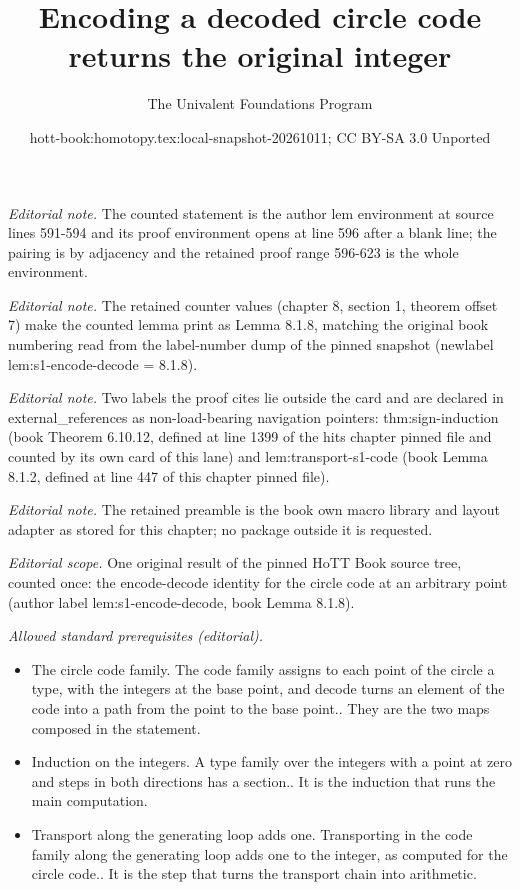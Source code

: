 \documentclass[10pt,a4paper]{article}
\title{Encoding a decoded circle code returns the original integer}
\author{The Univalent Foundations Program}
\date{hott-book:homotopy.tex:local-snapshot-20261011; CC BY-SA 3.0 Unported}
\newcounter{chapter}
\theoremstyle{definition}
\theoremstyle{remark}
\numberwithin{equation}{section}
\begin{document}
\maketitle
\setcounter{chapter}{8}
\setcounter{section}{1}
\setcounter{thm}{7}
\noindent\textit{Editorial note.} The counted statement is the author lem environment at source lines 591-594 and its proof environment opens at line 596 after a blank line; the pairing is by adjacency and the retained proof range 596-623 is the whole environment.\par\medskip
\noindent\textit{Editorial note.} The retained counter values (chapter 8, section 1, theorem offset 7) make the counted lemma print as Lemma 8.1.8, matching the original book numbering read from the label-number dump of the pinned snapshot (newlabel lem:s1-encode-decode = 8.1.8).\par\medskip
\noindent\textit{Editorial note.} Two labels the proof cites lie outside the card and are declared in external\_references as non-load-bearing navigation pointers: thm:sign-induction (book Theorem 6.10.12, defined at line 1399 of the hits chapter pinned file and counted by its own card of this lane) and lem:transport-s1-code (book Lemma 8.1.2, defined at line 447 of this chapter pinned file).\par\medskip
\noindent\textit{Editorial note.} The retained preamble is the book own macro library and layout adapter as stored for this chapter; no package outside it is requested.\par\medskip
\noindent\textit{Editorial scope.} One original result of the pinned HoTT Book source tree, counted once: the encode-decode identity for the circle code at an arbitrary point (author label lem:s1-encode-decode, book Lemma 8.1.8).\par\medskip
\noindent\textit{Allowed standard prerequisites (editorial).}\begin{itemize}
\item The circle code family. The code family assigns to each point of the circle a type, with the integers at the base point, and decode turns an element of the code into a path from the point to the base point.. They are the two maps composed in the statement.
\item Induction on the integers. A type family over the integers with a point at zero and steps in both directions has a section.. It is the induction that runs the main computation.
\item Transport along the generating loop adds one. Transporting in the code family along the generating loop adds one to the integer, as computed for the circle code.. It is the step that turns the transport chain into arithmetic.
\end{itemize}\medskip
\end{document}

